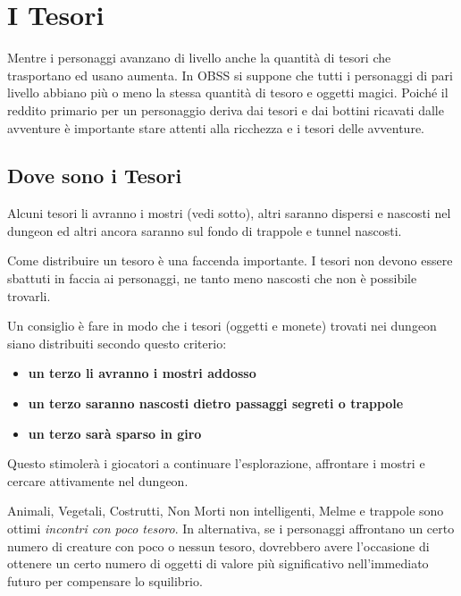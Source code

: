 \section{I Tesori}\label{disporretesori}

\begin{multicols}{2}

Mentre i personaggi avanzano di livello anche la quantità di tesori che trasportano ed usano aumenta. In OBSS si suppone che tutti i personaggi di pari livello abbiano più o meno la stessa quantità di tesoro e oggetti magici. Poiché il reddito primario per un personaggio deriva dai tesori e dai bottini ricavati dalle avventure è importante stare attenti alla ricchezza e i tesori delle avventure.

\subsection{Dove sono i Tesori}

Alcuni tesori li avranno i mostri (vedi sotto), altri saranno dispersi e nascosti nel dungeon ed altri ancora saranno sul fondo di trappole e tunnel nascosti.

Come distribuire un tesoro è una faccenda importante. I tesori non devono essere sbattuti in faccia ai personaggi, ne tanto meno nascosti che non è possibile trovarli.

Un consiglio è fare in modo che i tesori (oggetti e monete) trovati nei dungeon siano distribuiti secondo questo criterio:

\begin{itemize}[leftmargin=*] \setlength{\itemsep}{0pt}
\item \textbf{un terzo li avranno i mostri addosso}
\item \textbf{un terzo saranno nascosti dietro passaggi segreti o trappole}
\item \textbf{un terzo sarà sparso in giro}
\end{itemize}

Questo stimolerà i giocatori a continuare l'esplorazione, affrontare i mostri e cercare attivamente nel dungeon.

Animali, Vegetali, Costrutti, Non Morti non intelligenti, Melme e trappole sono ottimi \emph{incontri con poco tesoro}.
In alternativa, se i personaggi affrontano un certo numero di creature con poco o nessun tesoro, dovrebbero avere l'occasione di ottenere un certo numero di oggetti di valore più significativo nell'immediato futuro per compensare lo squilibrio.


\end{multicols}
